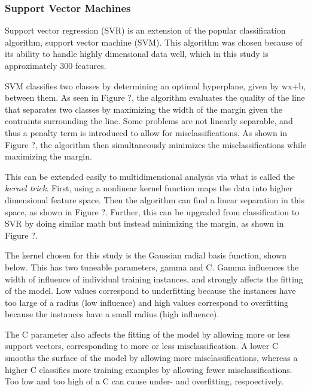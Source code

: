 \subsubsection{Support Vector Machines}
\label{sec:svm}


Support vector regression (SVR) is an extension of the popular classification
algorithm, support vector machine (SVM).  This algorithm was chosen because of
its ability to handle highly dimensional data well, which in this study is
approximately 300 features. 

SVM classifies two classes by determining an optimal hyperplane, given by wx+b,
between them.  As seen in Figure ?, the algorithm evaluates the quality of the
line that separates two classes by maximizing the width of the margin given the
contraints surrounding the line.  Some problems are not linearly separable, and
thus a penalty term is introduced to allow for misclassifications. As shown in
Figure ?, the algorithm then simultaneously minimizes the misclassifications
while maximizing the margin. 

This can be extended easily to multidimensional analysis via what is called the
\textit{kernel trick}.  First, using a nonlinear kernel function maps the data
into higher dimensional feature space. Then the algorithm can find a linear
separation in this space, as shown in Figure ?. Further, this can be upgraded
from classification to SVR by doing similar math but instead minimizing the
margin, as shown in Figure ?. 

The kernel chosen for this study is the Gaussian radial basis function, shown
below. This has two tuneable parameters, gamma and C. Gamma influences the
width of influence of individual training instances, and strongly affects the
fitting of the model. Low values correspond to underfitting because the
instances have too large of a radius (low influence) and high values correspond
to overfitting because the instances have a small radius (high influence). 

The C parameter also affects the fitting of the model by allowing more or less
support vectors, corresponding to more or less misclassification. A lower C
smooths the surface of the model by allowing more misclassifications, whereas a
higher C classifies more training examples by allowing fewer
misclassifications. Too low and too high of a C can cause under- and
overfitting, respoectively. 

